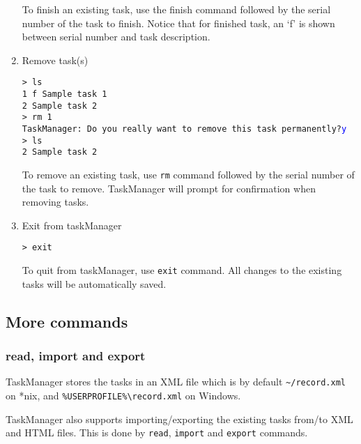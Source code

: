 \documentclass[12pt, a4paper]{article}
\begin{document}
\begin{enumerate}
To finish an existing task, use the finish command followed by the serial number of the task to finish. 
Notice that for finished task, an `f' is shown between serial number and task description.

\item Remove task(s)

\texttt{\textgreater \ ls\\
    1 f Sample task 1\\
    2   Sample task 2\\
    \textgreater \ rm 1\\
    TaskManager: Do you really want to remove this task permanently?\textcolor{blue}{y}\\
    \textgreater \ ls\\
    2   Sample task 2}

To remove an existing task, use \texttt{rm} command followed by the serial number of the task to remove. TaskManager will prompt for confirmation when removing tasks.

\item Exit from taskManager

\texttt{\textgreater \ exit}

To quit from taskManager, use \texttt{exit} command. 
All changes to the existing tasks will be automatically saved.
\end{enumerate}

\subsection{More commands}
\subsubsection{read, import and export}

TaskManager stores the tasks in an XML file which is by default \texttt{\~{}/record.xml} on *nix, and \texttt{\%USERPROFILE\%\textbackslash record.xml} on Windows.

TaskManager also supports importing/exporting the existing tasks from/to XML and HTML files. This is done by \texttt{read}, \texttt{import} and \texttt{export} commands.
\end{document}
